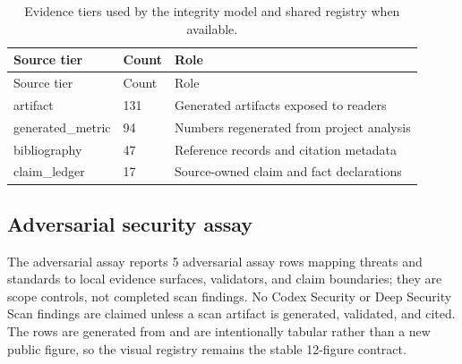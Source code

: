 \documentclass[
]{article}
\begin{document}
\begin{longtable}[]{@{}lll@{}}
\caption{Evidence tiers used by the integrity model and shared registry
when available.}\label{tbl:evidence_tiers}\tabularnewline
\toprule\noalign{}
Source tier & Count & Role \\
\midrule\noalign{}
\endfirsthead
\toprule\noalign{}
Source tier & Count & Role \\
\midrule\noalign{}
\endhead
\bottomrule\noalign{}
\endlastfoot
artifact & 131 & Generated artifacts exposed to readers \\
generated\_metric & 94 & Numbers regenerated from project analysis \\
bibliography & 47 & Reference records and citation metadata \\
claim\_ledger & 17 & Source-owned claim and fact declarations \\
\end{longtable}

\subsection{Adversarial security
assay}\label{adversarial-security-assay}

The adversarial assay reports 5 adversarial assay rows mapping threats
and standards to local evidence surfaces, validators, and claim
boundaries; they are scope controls, not completed scan findings. No
Codex Security or Deep Security Scan findings are claimed unless a scan
artifact is generated, validated, and cited. The rows are generated from
 and are intentionally tabular
rather than a new public figure, so the visual registry remains the
stable 12-figure contract.
\end{document}
